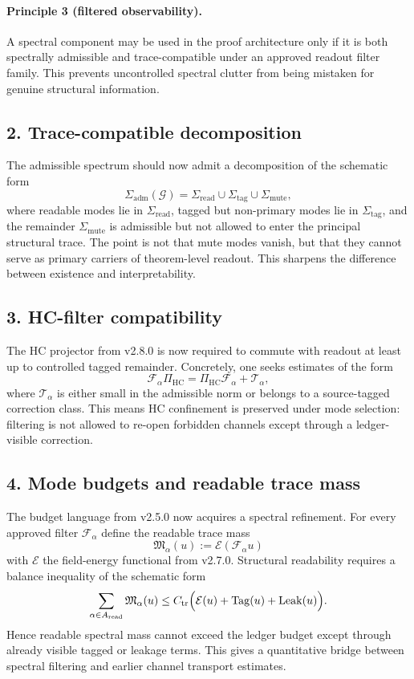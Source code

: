 \paragraph{Principle 3 (filtered observability).}
A spectral component may be used in the proof architecture only if it is both
spectrally admissible and trace-compatible under an approved readout filter family.
This prevents uncontrolled spectral clutter from being mistaken for genuine
structural information.

\subsection*{2. Trace-compatible decomposition}
The admissible spectrum should now admit a decomposition of the schematic form
\[
\Sigma_{\mathrm{adm}}(\mathcal G)
= \Sigma_{\mathrm{read}} \cup \Sigma_{\mathrm{tag}} \cup \Sigma_{\mathrm{mute}},
\]
where readable modes lie in $\Sigma_{\mathrm{read}}$, tagged but non-primary modes lie
in $\Sigma_{\mathrm{tag}}$, and the remainder $\Sigma_{\mathrm{mute}}$ is admissible but
not allowed to enter the principal structural trace. The point is not that mute
modes vanish, but that they cannot serve as primary carriers of theorem-level
readout. This sharpens the difference between existence and interpretability.

\subsection*{3. HC-filter compatibility}
The HC projector from v2.8.0 is now required to commute with readout at least up to
controlled tagged remainder. Concretely, one seeks estimates of the form
\[
\mathcal F_\alpha \Pi_{\mathrm{HC}}
= \Pi_{\mathrm{HC}} \mathcal F_\alpha + \mathcal T_\alpha,
\]
where $\mathcal T_\alpha$ is either small in the admissible norm or belongs to a
source-tagged correction class. This means HC confinement is preserved under mode
selection: filtering is not allowed to re-open forbidden channels except through a
ledger-visible correction.

\subsection*{4. Mode budgets and readable trace mass}
The budget language from v2.5.0 now acquires a spectral refinement. For every
approved filter $\mathcal F_\alpha$ define the readable trace mass
\[
\mathfrak M_\alpha(u) := \mathcal E(\mathcal F_\alpha u)
\]
with $\mathcal E$ the field-energy functional from v2.7.0. Structural readability
requires a balance inequality of the schematic form
\[
\sum_{\alpha\in A_{\mathrm{read}}} \mathfrak M_\alpha(u)
\le C_{\mathrm{tr}}
\Bigl( \mathcal E(u) + \mathrm{Tag}(u) + \mathrm{Leak}(u) \Bigr).
\]
Hence readable spectral mass cannot exceed the ledger budget except through already
visible tagged or leakage terms. This gives a quantitative bridge between spectral
filtering and earlier channel transport estimates.

